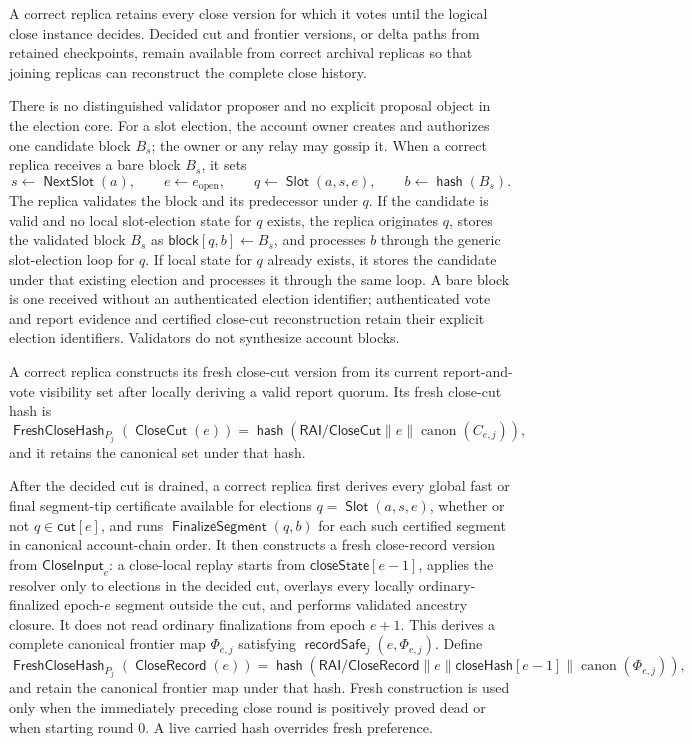 \documentclass[sigplan,twocolumn,review,anonymous]{acmart}
\newcommand{\func}[1]{\operatorname{\mathsf{#1}}}
\newcommand{\hash}{\func{hash}}
\newcommand{\Slot}{\func{Slot}}
\newcommand{\NextSlot}{\func{NextSlot}}
\newcommand{\CloseCut}{\func{CloseCut}}
\newcommand{\CloseRecord}{\func{CloseRecord}}
\newcommand{\FreshCloseHash}{\func{FreshCloseHash}}
\newcommand{\blockMap}{\mathsf{block}}
\newcommand{\closeHash}{\mathsf{closeHash}}
\newcommand{\FinalizeSegment}{\func{FinalizeSegment}}
\newcommand{\recordSafe}{\func{recordSafe}}
\newcommand{\closeCut}{\mathsf{cut}}
\newcommand{\closeState}{\mathsf{closeState}}
\begin{document}
A correct replica retains every close version for which it votes until the logical close instance
decides.  Decided cut and frontier versions, or delta paths from retained checkpoints, remain available
from correct archival replicas so that joining replicas can reconstruct the complete close history.

There is no distinguished validator proposer and no explicit proposal object in the election core.
For a slot election, the account owner creates and authorizes one candidate block \(B_s\);
the owner or any relay may gossip it.  When a correct replica receives a bare block \(B_s\), it sets
\[
s\gets\NextSlot(a),\qquad e\gets e_{\mathrm{open}},\qquad q\gets\Slot(a,s,e),
\qquad b\gets\hash(B_s).
\]
The replica validates the block and its predecessor under \(q\).  If the candidate is valid and no local
slot-election state for \(q\) exists, the replica originates \(q\), stores the validated block
\(B_s\) as \(\blockMap[q,b]\gets B_s\), and processes \(b\) through the generic slot-election
loop for \(q\).  If local state for \(q\) already exists, it stores the candidate under that existing election
and processes it through the same loop.  A bare block is one received without an authenticated election
identifier; authenticated vote and report evidence and certified close-cut reconstruction retain their explicit
election identifiers.  Validators do not synthesize account blocks.

A correct replica constructs its fresh close-cut version from its current report-and-vote visibility set after
locally deriving a valid report quorum.  Its fresh close-cut hash is
\[
\FreshCloseHash_{P_j}(\CloseCut(e))
=
\hash(\mathsf{RAI/CloseCut}\parallel e\parallel\operatorname{canon}(C_{e,j})),
\]
and it retains the canonical set under that hash.

After the decided cut is drained, a correct replica first derives every global fast or final segment-tip
certificate available for elections \(q=\Slot(a,s,e)\), whether or not \(q\in\closeCut[e]\), and runs
\(\FinalizeSegment(q,b)\) for each such certified segment in canonical account-chain order.  It then
constructs a fresh close-record version from \(\mathsf{CloseInput}_e\): a close-local replay starts from
\(\closeState[e-1]\), applies the resolver only to elections in the decided cut, overlays every locally
ordinary-finalized epoch-\(e\) segment outside the cut, and performs validated ancestry closure.  It does
not read ordinary finalizations from epoch \(e+1\).  This derives a complete canonical frontier map
\(\Phi_{e,j}\) satisfying \(\recordSafe_j(e,\Phi_{e,j})\).  Define
\[
\FreshCloseHash_{P_j}(\CloseRecord(e))
=
\hash(\mathsf{RAI/CloseRecord}\parallel e\parallel\closeHash[e-1]
\parallel\operatorname{canon}(\Phi_{e,j})),
\]
and retain the canonical frontier map under that hash.
Fresh construction is used only when the immediately preceding close round is positively proved dead
or when starting round \(0\).  A live carried hash overrides fresh preference.
\end{document}
